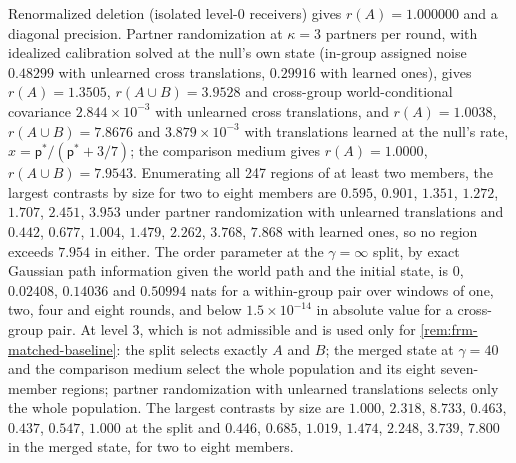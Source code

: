 \begin{numcheck}\label{chk:frm-nulls}
Renormalized deletion (isolated level-0 receivers) gives $r(A)=1.000000$ and a diagonal precision. Partner randomization at $\kappa=3$ partners per round, with idealized calibration solved at the null's own state (in-group assigned noise $0.48299$ with unlearned cross translations, $0.29916$ with learned ones), gives $r(A)=1.3505$, $r(A\cup B)=3.9528$ and cross-group world-conditional covariance $2.844\times10^{-3}$ with unlearned cross translations, and $r(A)=1.0038$, $r(A\cup B)=7.8676$ and $3.879\times10^{-3}$ with translations learned at the null's rate, $x=\mathsf p^\ast/(\mathsf p^\ast+3/7)$; the comparison medium gives $r(A)=1.0000$, $r(A\cup B)=7.9543$. Enumerating all 247 regions of at least two members, the largest contrasts by size for two to eight members are $0.595$, $0.901$, $1.351$, $1.272$, $1.707$, $2.451$, $3.953$ under partner randomization with unlearned translations and $0.442$, $0.677$, $1.004$, $1.479$, $2.262$, $3.768$, $7.868$ with learned ones, so no region exceeds $7.954$ in either. The order parameter at the $\gamma=\infty$ split, by exact Gaussian path information given the world path and the initial state, is $0$, $0.02408$, $0.14036$ and $0.50994$ nats for a within-group pair over windows of one, two, four and eight rounds, and below $1.5\times10^{-14}$ in absolute value for a cross-group pair. At level $3$, which is not admissible and is used only for \cref{rem:frm-matched-baseline}: the split selects exactly $A$ and $B$; the merged state at $\gamma=40$ and the comparison medium select the whole population and its eight seven-member regions; partner randomization with unlearned translations selects only the whole population. The largest contrasts by size are $1.000$, $2.318$, $8.733$, $0.463$, $0.437$, $0.547$, $1.000$ at the split and $0.446$, $0.685$, $1.019$, $1.474$, $2.248$, $3.739$, $7.800$ in the merged state, for two to eight members.
\end{numcheck}

